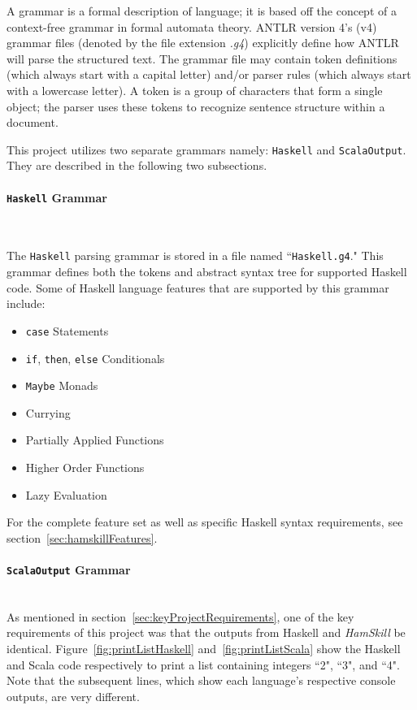 \documentclass{report}
\newcommand{\myparagraph}[1]{\paragraph{#1}\mbox{}\\}
\begin{document}
A grammar is a formal description of language; it is based off the concept of a context-free grammar in formal automata theory.  ANTLR version 4's (v4) grammar files (denoted by the file extension \emph{.g4}) explicitly define how ANTLR will parse the structured text.  The grammar file may contain token definitions (which always start with a capital letter) and/or parser rules (which always start with a lowercase letter).  A token is a group of characters that form a single object; the parser uses these tokens to recognize sentence structure within a document.

This project utilizes two separate grammars namely: \texttt{Haskell} and \texttt{ScalaOutput}.  They are described in the following two subsections.

\myparagraph{\texttt{Haskell} Grammar}\label{sec:haskellG4}

The \texttt{Haskell} parsing grammar is stored in a file named ``\texttt{Haskell.g4}."  This grammar defines both the tokens and abstract syntax tree for supported Haskell code.  Some of Haskell language features that are supported by this grammar include:

\begin{itemize}
   \item \texttt{case} Statements
   \item \texttt{if}, \texttt{then}, \texttt{else} Conditionals
   \item \texttt{Maybe} Monads
   \item Currying
   \item Partially Applied Functions
   \item Higher Order Functions
   \item Lazy Evaluation
\end{itemize}

For the complete feature set as well as specific Haskell syntax requirements, see section~\ref{sec:hamskillFeatures}.

\myparagraph{\texttt{ScalaOutput} Grammar} 

As mentioned in section~\ref{sec:keyProjectRequirements}, one of the key requirements of this project was that the outputs from Haskell and \textit{HamSkill} be identical.  Figure~\ref{fig:printListHaskell} and~\ref{fig:printListScala} show the Haskell and Scala code respectively to print a list containing integers ``2", ``3", and ``4".  Note that the subsequent lines, which show each language's respective console outputs, are very different.
\end{document}
